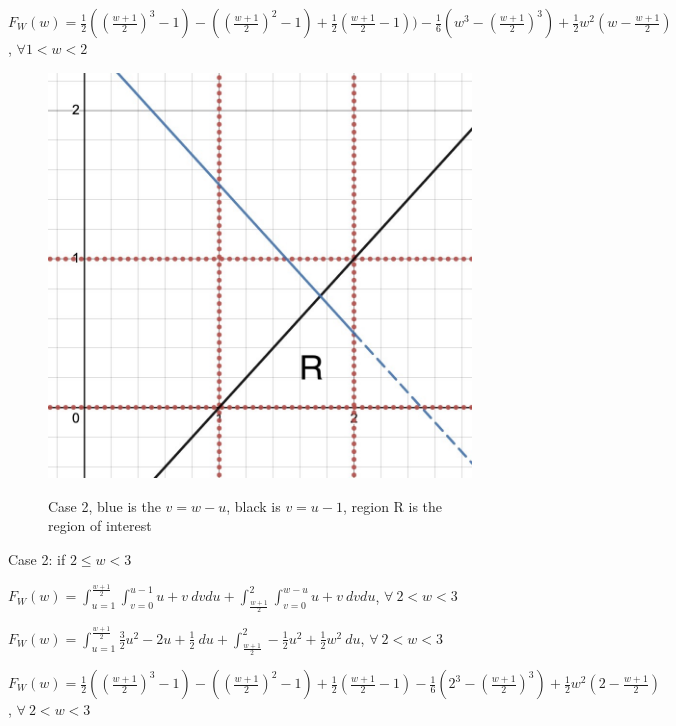 \documentclass{article} %
\begin{document}
    $F_W(w)=\frac{1}{2}((\frac{w+1}{2})^3-1)-((\frac{w+1}{2})^2-1)+\frac{1}{2}(\frac{w+1}{2}-1))-\frac{1}{6}(w^3-(\frac{w+1}{2})^3)+\frac{1}{2}w^2(w-\frac{w+1}{2})$, $\forall 1 < w <2$
\newpage
\begin{figure}[]
    \centering
    \includegraphics[scale=0.20]{HW/HW4/p1c_case2.jpg}
    \label{fig:$F_W,2$}
    \caption{Case 2, blue is the $v = w-u$, black is $v = u-1$, region R is the region of interest}    
\end{figure}

    Case 2: if $2 \leq w < 3$

    $F_W(w)=\int_{u=1}^{\frac{w+1}{2}}\int_{v=0}^{u-1}u+v \ dvdu + \int_{\frac{w+1}{2}}^{2}\int_{v=0}^{w-u}u+v \ dvdu$, $\forall \ 2<w<3$

    $F_W(w)=\int_{u=1}^{\frac{w+1}{2}}\frac{3}{2}u^2-2u+\frac{1}{2} \ du + \int_{\frac{w+1}{2}}^{2}-\frac{1}{2}u^2+\frac{1}{2}w^2 \ du$, $\forall \ 2<w<3$

    $F_W(w)=\frac{1}{2}((\frac{w+1}{2})^3-1)-((\frac{w+1}{2})^2-1)+\frac{1}{2}(\frac{w+1}{2}-1)-\frac{1}{6}(2^3-(\frac{w+1}{2})^3)+\frac{1}{2}w^2(2-\frac{w+1}{2})$, $\forall \ 2<w<3$ \\
\end{document}
